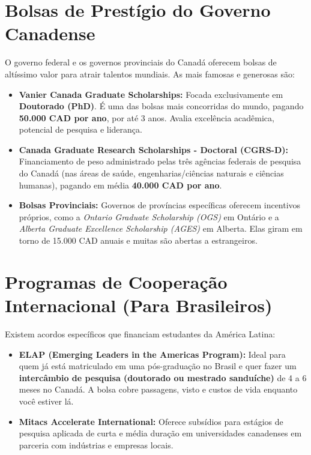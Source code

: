 \documentclass[12pt,a4paper]{article}
\begin{document}
\section{Bolsas de Prestígio do Governo Canadense}
O governo federal e os governos provinciais do Canadá oferecem bolsas de altíssimo valor para atrair talentos mundiais. As mais famosas e generosas são:

\begin{itemize}[leftmargin=*]
    \item \textbf{Vanier Canada Graduate Scholarships:} Focada exclusivamente em \textbf{Doutorado (PhD)}. É uma das bolsas mais concorridas do mundo, pagando \textbf{50.000 CAD por ano}, por até 3 anos. Avalia excelência acadêmica, potencial de pesquisa e liderança.
    \item \textbf{Canada Graduate Research Scholarships - Doctoral (CGRS-D):} Financiamento de peso administrado pelas três agências federais de pesquisa do Canadá (nas áreas de saúde, engenharias/ciências naturais e ciências humanas), pagando em média \textbf{40.000 CAD por ano}.
    \item \textbf{Bolsas Provinciais:} Governos de províncias específicas oferecem incentivos próprios, como a \textit{Ontario Graduate Scholarship (OGS)} em Ontário e a \textit{Alberta Graduate Excellence Scholarship (AGES)} em Alberta. Elas giram em torno de 15.000 CAD anuais e muitas são abertas a estrangeiros.
\end{itemize}

\section{Programas de Cooperação Internacional (Para Brasileiros)}
Existem acordos específicos que financiam estudantes da América Latina:

\begin{itemize}[leftmargin=*]
    \item \textbf{ELAP (Emerging Leaders in the Americas Program):} Ideal para quem já está matriculado em uma pós-graduação no Brasil e quer fazer um \textbf{intercâmbio de pesquisa (doutorado ou mestrado sanduíche)} de 4 a 6 meses no Canadá. A bolsa cobre passagens, visto e custos de vida enquanto você estiver lá.
    \item \textbf{Mitacs Accelerate International:} Oferece subsídios para estágios de pesquisa aplicada de curta e média duração em universidades canadenses em parceria com indústrias e empresas locais.
\end{itemize}
\end{document}
